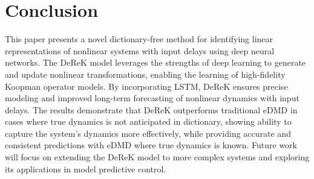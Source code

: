\documentclass[conference]{IEEEtran}
\begin{document}
\section{Conclusion}
This paper presents a novel dictionary-free method for identifying linear representations of nonlinear systems with input delays using deep neural networks. The DeReK model leverages the strengths of deep learning to generate and update nonlinear transformations, enabling the learning of high-fidelity Koopman operator models. By incorporating LSTM, DeReK ensures precise modeling and improved long-term forecasting of nonlinear dynamics with input delays. The results demonstrate that DeReK outperforms traditional eDMD in cases where true dynamics is not anticipated in dictionary, showing ability to capture the system's dynamics more effectively, while providing accurate and consistent predictions with eDMD where true dynamics is known. Future work will focus on extending the DeReK model to more complex systems and exploring its applications in model predictive control.



\end{document}
